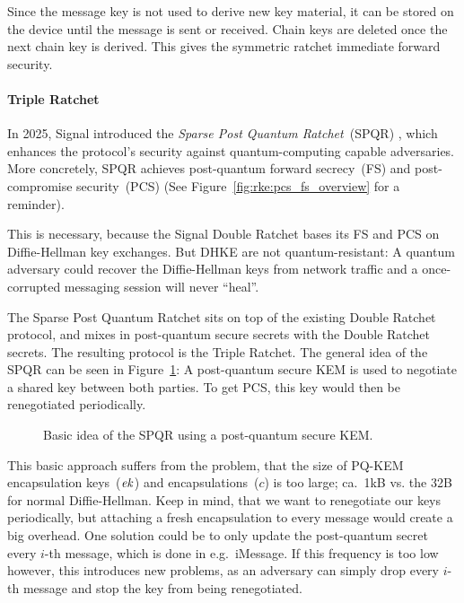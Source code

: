 Since the message key is not used to derive new key material, it can be stored on the device until the message is sent or received.
Chain keys are deleted once the next chain key is derived.
This gives the symmetric ratchet immediate forward security.

\paragraph{Triple Ratchet} 
In 2025, Signal introduced the \emph{Sparse Post Quantum Ratchet}~(SPQR) \cite{EPRINT:DJKPS25}, which enhances the protocol's security against quantum-computing capable adversaries.
More concretely, SPQR achieves post-quantum forward secrecy~(FS) and post-compromise security~(PCS) (See Figure~\ref{fig:rke:pcs_fs_overview} for a reminder).

This is necessary, because the Signal Double Ratchet bases its FS and PCS on Diffie-Hellman key exchanges.
But DHKE are not quantum-resistant:
A quantum adversary could recover the Diffie-Hellman keys from network traffic and a once-corrupted messaging session will never ``heal''.

The Sparse Post Quantum Ratchet sits on top of the existing Double Ratchet protocol, and mixes in post-quantum secure secrets with the Double Ratchet secrets.
The resulting protocol is the Triple Ratchet.
The general idea of the SPQR can be seen in Figure~\ref{fig:double-ratchet:triple-ratchet-idea}:
A post-quantum secure KEM is used to negotiate a shared key between both parties.
To get PCS, this key would then be renegotiated periodically.

\begin{figure}[!ht]
    \centering
    
    \caption{Basic idea of the SPQR using a post-quantum secure KEM.}\label{fig:double-ratchet:triple-ratchet-idea}
\end{figure}

This basic approach suffers from the problem, that the size of PQ-KEM encapsulation keys~($\mathit{ek}$) and encapsulations~($c$) is too large; ca.\ 1kB vs. the 32B for normal Diffie-Hellman.
Keep in mind, that we want to renegotiate our keys periodically, but attaching a fresh encapsulation to every message would create a big overhead.
One solution could be to only update the post-quantum secret every $i$-th message, which is done in e.g.\ iMessage.
If this frequency is too low however, this introduces new problems, as an adversary can simply drop every $i$-th message and stop the key from being renegotiated.

